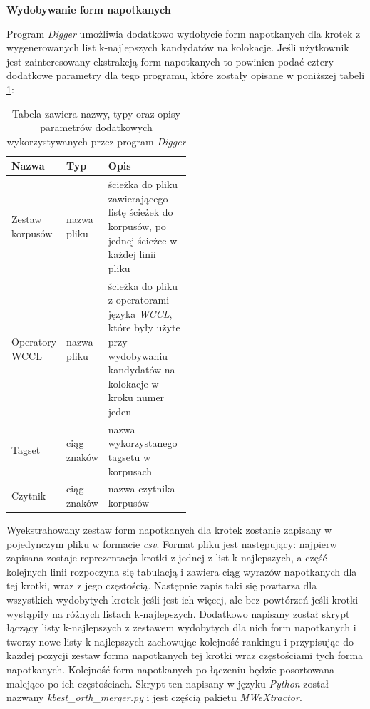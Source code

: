\documentclass[11pt,a4paper]{llncs}
\begin{document}
\noindent\textbf{Wydobywanie form napotkanych}


Program \emph{Digger} umożliwia dodatkowo wydobycie form napotkanych dla krotek z wygenerowanych list k-najlepszych kandydatów na kolokacje.
Jeśli użytkownik jest zainteresowany ekstrakcją form napotkanych to powinien podać cztery dodatkowe parametry dla tego programu, które zostały opisane w poniższej tabeli \ref{digger_parameters_orths}:

\begin{table}[h!]
\centering
\begin{tabular}{l | l | p{0.5\linewidth}}
	\toprule 
	Nazwa & Typ & Opis \\
	\midrule 
	Zestaw korpusów & nazwa pliku & ścieżka do pliku zawierającego listę ścieżek do korpusów, po jednej ścieżce w każdej linii pliku \\ 
	\hline
	Operatory WCCL & nazwa pliku & ścieżka do pliku z operatorami języka \emph{WCCL}, które były użyte przy wydobywaniu kandydatów na kolokacje w kroku numer jeden\\ 
	\hline
	Tagset & ciąg znaków & nazwa wykorzystanego tagsetu w korpusach \\
	\hline
	Czytnik & ciąg znaków & nazwa czytnika korpusów\\
	\bottomrule
\end{tabular}
\caption[Parametery dodatkowe programu \emph{Digger}]{Tabela zawiera nazwy, typy oraz opisy parametrów dodatkowych wykorzystywanych przez program \emph{Digger}}
\label{digger_parameters_orths}
\end{table}

Wyekstrahowany zestaw form napotkanych dla krotek zostanie zapisany w pojedynczym pliku w formacie \emph{csv}.
Format pliku jest następujący: najpierw zapisana zostaje reprezentacja krotki z jednej z list k-najlepszych, a część kolejnych linii rozpoczyna się tabulacją i zawiera ciąg wyrazów napotkanych dla tej krotki, wraz z jego częstością.
Następnie zapis taki się powtarza dla wszystkich wydobytych krotek jeśli jest ich więcej, ale bez powtórzeń jeśli krotki wystąpiły na różnych listach k-najlepszych.
Dodatkowo napisany został skrypt łączący listy k-najlepszych z zestawem wydobytych dla nich form napotkanych i tworzy nowe listy k-najlepszych zachowując kolejność rankingu i przypisując do każdej pozycji zestaw forma napotkanych tej krotki wraz częstościami tych forma napotkanych.
Kolejność form napotkanych po łączeniu będzie posortowana malejąco po ich częstościach.
Skrypt ten napisany w języku \emph{Python} został nazwany \emph{kbest\_orth\_merger.py} i jest częścią pakietu \emph{MWeXtractor}.
\end{document}
